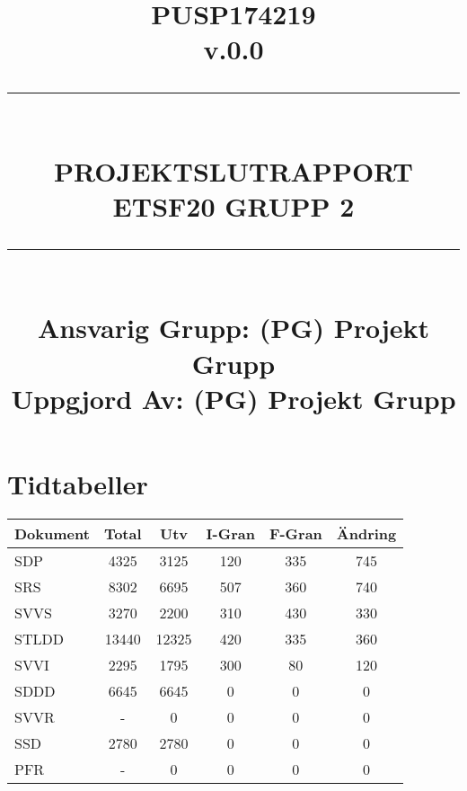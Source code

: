 \documentclass[paper=a4, fontsize=11pt,twoside]{article}
\title{
		\documentNumber{#1}																						
		\documentVersion{#2}																				
		\HRule{0.5pt} \\ %
		\LARGE \textbf{\uppercase{#3}} \\
		\large \textbf{\uppercase{ETSF20 Grupp 2}} 
		\HRule{2pt} \\ [1.5cm]    
		\normalsize            
		\documentResponsible{#4} \\ 
		\documentCreator{#4}  
	}
\newcommand{\HRule}[1]{\rule{\linewidth}{#1}}
\newcommand{\documentNumber}[1]{\centering PUSP1742#1 \\[1.0cm]}
\newcommand{\documentVersion}[1]{\centering \small{v.#1} \\[1.0cm]}
\newcommand{\documentResponsible}[1]{\centering  Ansvarig Grupp: #1}
\newcommand{\documentCreator}[1]{\centering Uppgjord Av: #1}
\newcommand{\grouptitlepage}[4]{ 
	\title{
		\documentNumber{#1}																						
		\documentVersion{#2}																				
		\HRule{0.5pt} \\ %
		\LARGE \textbf{\uppercase{#3}} \\
		\large \textbf{\uppercase{ETSF20 Grupp 2}} 
		\HRule{2pt} \\ [1.5cm]    
		\normalsize            
		\documentResponsible{#4} \\ 
		\documentCreator{#4}  
	}																							
	\maketitle																							
	\thispagestyle{empty} 																					
	\newpage 
}
\begin{document}
\grouptitlepage
{19}
{0.0}
{Projektslutrapport}
{(PG) Projekt Grupp}
\tableofcontents

\section{Tidtabeller}
\begin{tabular}{|l|c|c|c|c|c|}
\hline
\textbf{Dokument} & \textbf{Total} & \textbf{Utv} & \textbf{I-Gran} &
\textbf{F-Gran} & \textbf{Ändring}\\
\hline
SDP & 4325 & 3125 & 120 & 335 & 745\\
\hline
SRS & 8302 & 6695 & 507 & 360 & 740\\
\hline
SVVS & 3270 & 2200 & 310 & 430 & 330\\
\hline
STLDD & 13440 & 12325 & 420 & 335 & 360\\
\hline
SVVI & 2295 & 1795 & 300 & 80 & 120\\
\hline
SDDD & 6645 & 6645 & 0 & 0 & 0\\
\hline
SVVR & - & 0 & 0 & 0 & 0\\
\hline
SSD & 2780 & 2780 & 0 & 0 & 0\\
\hline
PFR & - & 0 & 0 & 0 & 0\\
\hline
\end{tabular}
\end{document}
